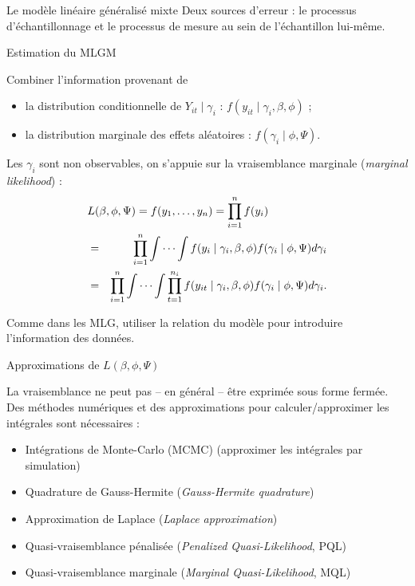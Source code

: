 \documentclass{BeamerTemplate}
\begin{document}
\begin{refsection}
\begin{frame}{Le modèle linéaire généralisé mixte}
\bigskip
Deux sources d'erreur : le processus d'échantillonnage et le processus de mesure
au sein de l'échantillon lui-même.
\end{frame}

\begin{frame}{Estimation du MLGM}

Combiner l'information provenant de
\begin{itemize}
\item la distribution conditionnelle de $Y_{it}
\mid \gamma_i$ : $f(y_{it} \mid \gamma_i, \beta, \phi)$ ;
\item la distribution marginale des effets aléatoires : $f(\gamma_i \mid
\phi, \Psi)$.
\end{itemize}

\bigskip
Les $\gamma_i$ sont non observables, on s'appuie sur la {\color{blue}vraisemblance marginale} (\textit{marginal likelihood}) :
\begin{eqnarray*}
\lefteqn{L(\beta,\phi, \Psi) = f(y_1,\ldots,y_n)= \prod_{i=1}^n f(y_i) }\\
& = & \prod_{i=1}^n \int \cdots \int f(y_{i} \mid \gamma_i, \beta, \phi)f(\gamma_i \mid \phi, \Psi) d \gamma_i  \\
& = & \prod_{i=1}^n \int \cdots \int \prod_{t=1}^{n_i} f(y_{it} \mid \gamma_i,
\beta, \phi) f(\gamma_i \mid \phi, \Psi) d \gamma_i.
\end{eqnarray*}

Comme dans les MLG, utiliser la relation du modèle pour introduire l'information des données.

\end{frame}

\begin{frame}{Approximations de $L(\beta,\phi, \Psi)$}

La vraisemblance ne peut pas -- en général -- être exprimée sous forme fermée.
Des méthodes numériques et des approximations pour calculer/approximer les intégrales sont nécessaires :
\begin{itemize}
\item Intégrations de Monte-Carlo (MCMC) (approximer les intégrales par simulation)
\item {\color{blue}Quadrature de Gauss-Hermite} (\textit{Gauss-Hermite quadrature})
\item {\color{blue}Approximation de Laplace} (\textit{Laplace approximation})
\item {\color{blue}Quasi-vraisemblance pénalisée} (\textit{Penalized Quasi-Likelihood}, PQL)
\item {\color{blue}Quasi-vraisemblance marginale} (\textit{Marginal Quasi-Likelihood}, MQL)
\end{itemize}


\end{frame}
\end{refsection}
\end{document}
